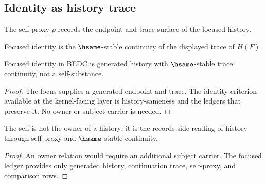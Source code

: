 \subsection{Identity as history trace}
\label{subsec:philosophy-identity-history-trace}

\begin{definition}
\label{def:philosophy-focused-self-proxy}
The self-proxy \(\rho\) records the endpoint and trace surface of the
focused history.
\end{definition}

\begin{definition}
\label{def:philosophy-history-continuous-identity}
Focused identity is the \(\hsame\)-stable continuity of the displayed
trace of \(H(F)\).
\end{definition}

\begin{theorem}
\label{thm:philosophy-identity-trace-continuity}
Focused identity in BEDC is generated history with
\(\hsame\)-stable trace continuity, not a self-substance.
\end{theorem}
\begin{proof}
The focus supplies a generated endpoint and trace. The identity
criterion available at the kernel-facing layer is history-sameness and
the ledgers that preserve it. No owner or subject carrier is needed.
\end{proof}

\begin{corollary}
\label{cor:philosophy-self-not-owner-history}
The self is not the owner of a history; it is the records-side reading
of history through self-proxy and \(\hsame\)-stable continuity.
\end{corollary}
\begin{proof}
An owner relation would require an additional subject carrier. The
focused ledger provides only generated history, continuation trace,
self-proxy, and comparison rows.
\end{proof}

